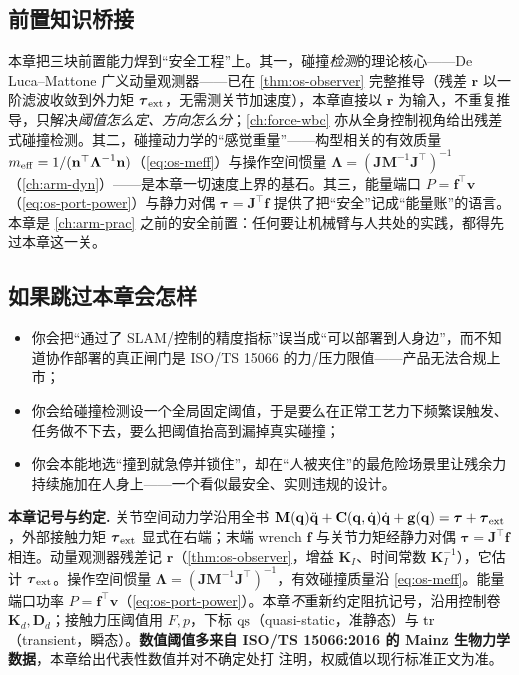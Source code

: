\subsection*{前置知识桥接}
本章把三块前置能力焊到“安全工程”上。其一，碰撞\emph{检测}的理论核心——De Luca--Mattone 广义动量观测器——已在 \cref{thm:os-observer} 完整推导（残差 $\mathbf r$ 以一阶滤波收敛到外力矩 $\boldsymbol\tau_{\rm ext}$，无需测关节加速度），本章直接以 $\mathbf r$ 为输入，不重复推导，只解决\emph{阈值怎么定、方向怎么分}；\cref{ch:force-wbc} 亦从全身控制视角给出残差式碰撞检测。其二，碰撞动力学的“感觉重量”——构型相关的有效质量 $m_{\rm eff}=1/(\mathbf n^\top\boldsymbol\Lambda^{-1}\mathbf n)$（\cref{eq:os-meff}）与操作空间惯量 $\boldsymbol\Lambda=(\mathbf J\mathbf M^{-1}\mathbf J^\top)^{-1}$（\cref{ch:arm-dyn}）——是本章一切速度上界的基石。其三，能量端口 $P=\mathbf f^\top\mathbf v$（\cref{eq:os-port-power}）与静力对偶 $\boldsymbol\tau=\mathbf J^\top\mathbf f$ 提供了把“安全”记成“能量账”的语言。本章是 \cref{ch:arm-prac} 之前的安全前置：任何要让机械臂与人共处的实践，都得先过本章这一关。

\subsection*{如果跳过本章会怎样}
\begin{itemize}
  \item 你会把“通过了 SLAM/控制的精度指标”误当成“可以部署到人身边”，而不知道协作部署的真正闸门是 ISO/TS 15066 的力/压力限值——产品无法合规上市；
  \item 你会给碰撞检测设一个全局固定阈值，于是要么在正常工艺力下频繁误触发、任务做不下去，要么把阈值抬高到漏掉真实碰撞；
  \item 你会本能地选“撞到就急停并锁住”，却在“人被夹住”的最危险场景里让残余力持续施加在人身上——一个看似最安全、实则违规的设计。
\end{itemize}

\begin{note}
\textbf{本章记号与约定.}\;
关节空间动力学沿用全书 $\mathbf M(\mathbf q)\ddot{\mathbf q}+\mathbf C(\mathbf q,\dot{\mathbf q})\dot{\mathbf q}+\mathbf g(\mathbf q)=\boldsymbol\tau+\boldsymbol\tau_{\rm ext}$，外部接触力矩 $\boldsymbol\tau_{\rm ext}$ 显式在右端；末端 wrench $\mathbf f$ 与关节力矩经静力对偶 $\boldsymbol\tau=\mathbf J^\top\mathbf f$ 相连。动量观测器残差记 $\mathbf r$（\cref{thm:os-observer}，增益 $\mathbf K_I$、时间常数 $\mathbf K_I^{-1}$），它估计 $\boldsymbol\tau_{\rm ext}$。操作空间惯量 $\boldsymbol\Lambda=(\mathbf J\mathbf M^{-1}\mathbf J^\top)^{-1}$，有效碰撞质量沿 \cref{eq:os-meff}。能量端口功率 $P=\mathbf f^\top\mathbf v$（\cref{eq:os-port-power}）。本章\emph{不}重新约定阻抗记号，沿用控制卷 $\mathbf K_d,\mathbf D_d$；接触力压阈值用 $F,p$，下标 $\rm qs$（quasi-static，准静态）与 $\rm tr$（transient，瞬态）。\textbf{数值阈值多来自 ISO/TS 15066:2016 的 Mainz 生物力学数据}，本章给出代表性数值并对不确定处打 \pz 注明，权威值以现行标准正文为准。
\end{note}


